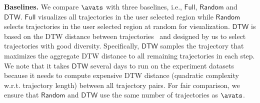 \vspace{1mm}

\noindent\textbf{Baselines.} We compare $\avats$ with three baselines, i.e., $\mathsf{Full}$, $\mathsf{Random}$ and $\mathsf{DTW}$. $\mathsf{Full}$ visualizes all trajectories in the user selected region while $\mathsf{Random}$ selects trajectories in the user selected region at random for visualization. $\mathsf{DTW}$ is based on the DTW distance between trajectories~\cite{borcan2012improving} and designed by us to select trajectories with good diversity. Specifically, $\mathsf{DTW}$ samples the trajectory that maximizes the aggregate DTW distance to all remaining trajectories in each step. We note that it takes $\mathsf{DTW}$ several days to run on the experiment datasets because it needs to compute expensive DTW distance (quadratic complexity w.r.t. trajectory length) between all trajectory pairs. For fair comparison, we ensure that $\mathsf{Random}$ and $\mathsf{DTW}$ use the same number of trajectories as $\avats$.                    







